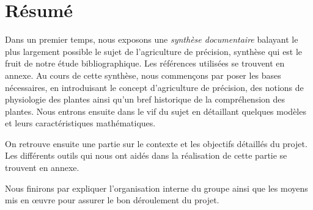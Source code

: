 \section{Résumé}

Dans un premier temps, nous exposons une \emph{synthèse documentaire}
balayant le plus largement possible le sujet de l'agriculture de précision,
synthèse qui est le fruit de notre étude bibliographique.
Les références utilisées se trouvent en annexe.
Au cours de cette synthèse, nous commençons par poser les bases
nécessaires, en introduisant le concept
d'agriculture de précision, des notions de physiologie des plantes
ainsi qu'un bref historique de la compréhension des plantes.
Nous entrons ensuite dans le vif du sujet en détaillant quelques modèles
et leurs caractéristiques mathématiques.

On retrouve ensuite une partie sur le contexte
et les objectifs détaillés du projet.
Les différents outils qui nous ont aidés dans la réalisation de
cette partie se trouvent en annexe.

Nous finirons par expliquer l'organisation interne du groupe
ainsi que les moyens mis en \oe{}uvre pour assurer
le bon déroulement du projet.